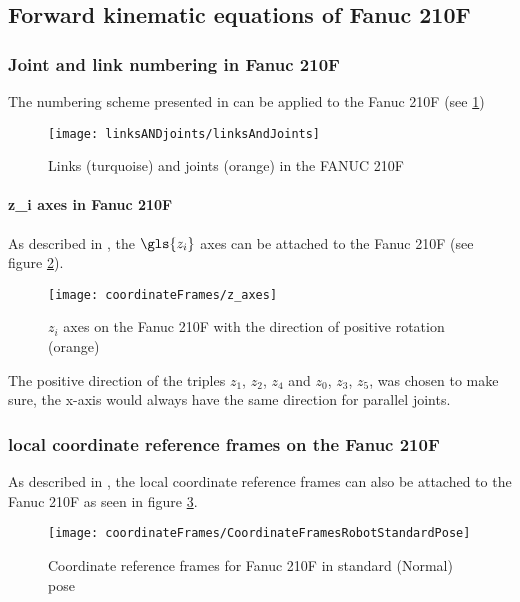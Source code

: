 \subsection{Forward kinematic equations of Fanuc 210F}

\subsubsection{Joint and link numbering in Fanuc 210F}
The numbering scheme presented in  can be applied to the Fanuc 210F (see  \cref{fig:LinksANDJoints210F}) 


\begin{figure}[H]
	\texttt{[image: linksANDjoints/linksAndJoints]}
	\caption{Links (turquoise) and joints (orange) in the FANUC 210F}
	\label{fig:LinksANDJoints210F}
\end{figure}

\paragraph{\textbf{\gls{z_i}} axes in Fanuc 210F}
As described in , the $\gls{z_i}$ axes can be attached to the Fanuc 210F (see figure \ref{fig:zi_Axes}).


\begin{figure}[H]
	\texttt{[image: coordinateFrames/z\_axes]}
	\caption{$z_i$ axes on the Fanuc 210F with the direction of positive rotation (orange)}
	\label{fig:zi_Axes}
\end{figure}


The positive direction of the triples $z_1$, $z_2$, $z_4$ and $z_0$, $z_3$, $z_5$, was chosen to make sure, the x-axis would always have the same direction for parallel joints. 

\subsubsection{local coordinate reference frames on the Fanuc 210F}

As described in , the local coordinate reference frames can also be attached to the Fanuc 210F as seen in figure \ref{fig:RefFrame}. 

\begin{figure}[H]
	\texttt{[image: coordinateFrames/CoordinateFramesRobotStandardPose]}
	\caption{Coordinate reference frames for Fanuc 210F in standard (Normal) pose}
	\label{fig:RefFrame}
\end{figure}


